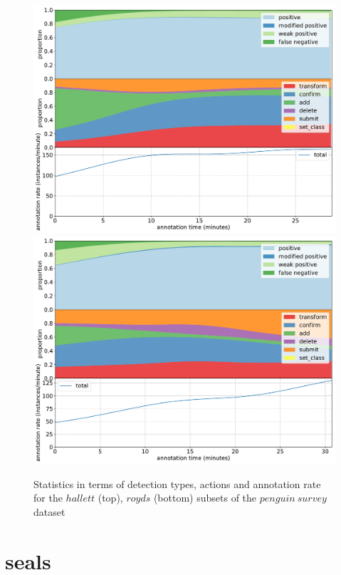 \pagebreak
\begin{figure}[H]
\begin{minipage}[c][\textheight]{\textwidth}
\centering
\includegraphics[width=1.0\linewidth]{charts/aerial_penguins/action_annotations/hallett_a.pdf}
\includegraphics[width=1.0\linewidth]{charts/aerial_penguins/action_annotations/royds_a.pdf}
\caption{ Statistics in terms of detection types, actions and annotation rate for the $hallett$ (top), $royds$ (bottom) subsets of the $penguin\:survey$ dataset }
\label{fig:royds_annotation}
\end{minipage}
\end{figure}


\pagebreak
\section {seals}
\label{sec:seals_details}


